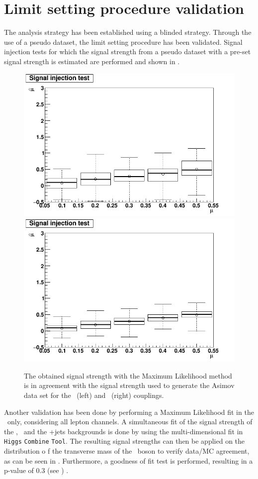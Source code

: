\section{Limit setting procedure validation}
\label{sec:val}
The analysis strategy has been established using a blinded strategy. Through the use of a pseudo dataset, the limit setting procedure has been validated. Signal injection tests for which the signal strength from a pseudo dataset with a pre-set  signal strength is estimated are performed and shown in . 
\begin{figure}[htbp]
	\centering
	 \includegraphics[width=0.49\linewidth]{6_Search/Figures/SignalInjection/plotZut}
	 \includegraphics[width=0.49\linewidth]{6_Search/Figures/SignalInjection/plotZct}
	\caption{The  obtained signal strength with the Maximum Likelihood method is in agreement with the signal strength used to generate the Asimov data set for the \Zut\ (left) and \Zct\ (right) couplings.}
	\label{fig:plotzut}
\end{figure}

Another validation has been done by performing a Maximum Likelihood fit in the \WZCR\ only, considering all lepton channels. A simultaneous fit of the signal strength of the \NPE, \NPM\ and the \WZ+jets backgrounds is done by using the multi-dimensional fit in \texttt{Higgs} \texttt{Combine} \texttt{Tool}. The resulting signal strengths can then be applied on the distribution o f the transverse mass of the \PW\ boson to verify data/MC agreement, as can be seen in . Furthermore, a goodness of fit test is performed, resulting in a p-value of 0.3 (see  ) .

